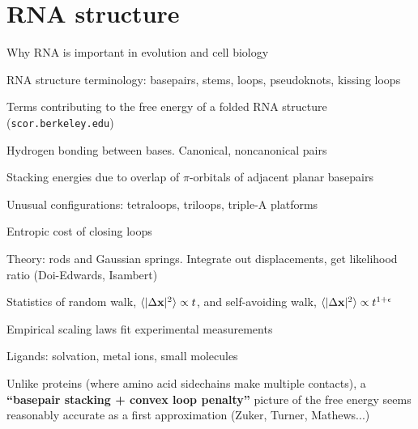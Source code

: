\documentclass{beamer}
\begin{document}
\section{RNA structure}

\begin{frame}{}

\itemb
\item Why RNA is important in evolution and cell biology
\iteme
\end{frame}

\begin{frame}{}

\itemb
\item RNA structure terminology: basepairs, stems, loops, pseudoknots, kissing loops
\iteme
\end{frame}

\begin{frame}{}

Terms contributing to the free energy of a folded RNA structure ({\tt scor.berkeley.edu})
 \itemb
 \item Hydrogen bonding between bases. Canonical, noncanonical pairs
 \item Stacking energies due to overlap of $\pi$-orbitals of adjacent planar basepairs
 \item Unusual configurations: tetraloops, triloops, triple-A platforms
\iteme
\end{frame}

\begin{frame}{}
 \itemb
 \item Entropic cost of closing loops
  \itemb
  \item Theory: rods and Gaussian springs. Integrate out displacements, get likelihood ratio (Doi-Edwards, Isambert)
  \item Statistics of random walk, $\langle |\Delta {\bf x}|^2 \rangle \propto t$, and self-avoiding walk, $\langle |\Delta {\bf x}|^2 \rangle \propto t^{1+\epsilon}$
  \item Empirical scaling laws fit experimental measurements
  \iteme
 \item Ligands: solvation, metal ions, small molecules
 \item Unlike proteins (where amino acid sidechains make multiple contacts),
a {\bf ``basepair stacking + convex loop penalty''} picture of the free energy seems reasonably accurate as a first approximation
(Zuker, Turner, Mathews...)
 \iteme
\end{frame}
\end{document}
